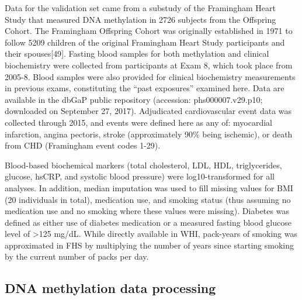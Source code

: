 \documentclass[]{bmcart}
\theoremstyle{definition}
\theoremstyle{definition}
\theoremstyle{definition}
\theoremstyle{remark}
\begin{document}
Data for the validation set came from a substudy of the Framingham Heart
Study that measured DNA methylation in 2726 subjects from the Offspring
Cohort. The Framingham Offspring Cohort was originally established in
1971 to follow 5209 children of the original Framingham Heart Study
participants and their spouses{[}49{]}. Fasting blood samples for both
methylation and clinical biochemistry were collected from participants
at Exam 8, which took place from 2005-8. Blood samples were also
provided for clinical biochemistry measurements in previous exams,
constituting the ``past exposures'' examined here. Data are available in
the dbGaP public repository (accession: phs000007.v29.p10; downloaded on
September 27, 2017). Adjudicated cardiovascular event data was collected
through 2015, and events were defined here as any of: myocardial
infarction, angina pectoris, stroke (approximately 90\% being ischemic),
or death from CHD (Framingham event codes 1-29).

Blood-based biochemical markers (total cholesterol, LDL, HDL,
triglycerides, glucose, hsCRP, and systolic blood pressure) were
log10-transformed for all analyses. In addition, median imputation was
used to fill missing values for BMI (20 individuals in total),
medication use, and smoking status (thus assuming no medication use and
no smoking where these values were missing). Diabetes was defined as
either use of diabetes medication or a measured fasting blood glucose
level of \textgreater{}125 mg/dL. While directly available in WHI,
pack-years of smoking was approximated in FHS by multiplying the number
of years since starting smoking by the current number of packs per day.

\subsection{DNA methylation data
processing}\label{dna-methylation-data-processing}
\end{document}
